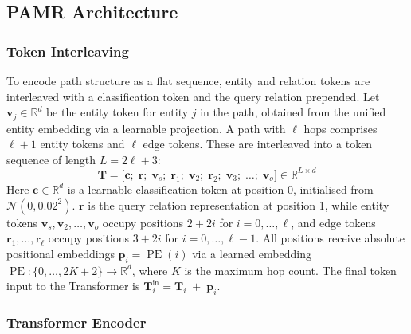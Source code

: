 \documentclass[runningheads]{llncs}
\begin{document}
\subsection{PAMR Architecture}
\label{sec:pamr-architecture}

\subsubsection{Token Interleaving}
\label{sec:token-interleaving}

To encode path structure as a flat sequence, entity and relation tokens are interleaved
with a classification token and the query relation prepended.
Let $\mathbf{v}_j \in \mathbb{R}^{d}$ be the entity token for entity $j$ in the path,
obtained from the unified entity embedding via a learnable projection.
A path with $\ell$ hops comprises $\ell+1$ entity tokens and $\ell$ edge tokens.
These are interleaved into a token sequence of length $L = 2\ell + 3$:
\begin{equation}
  \mathbf{T} = \bigl[\mathbf{c};\; \mathbf{r};\;
    \mathbf{v}_{s};\; \mathbf{r}_{1};\; \mathbf{v}_{2};\; \mathbf{r}_{2};\;
  \mathbf{v}_{3};\; \ldots;\; \mathbf{v}_{o}\bigr]
  \in \mathbb{R}^{L \times d}
  \label{eq:token-seq}
\end{equation}
Here $\mathbf{c} \in \mathbb{R}^{d}$ is a learnable classification token
at position 0, initialised from $\mathcal{N}(0, 0.02^2)$.
$\mathbf{r}$ is the query relation representation at position 1, while entity tokens
$\mathbf{v}_{s}, \mathbf{v}_{2}, \ldots, \mathbf{v}_{o}$ occupy positions $2 + 2i$
for $i = 0, \ldots, \ell$, and edge tokens $\mathbf{r}_{1}, \ldots, \mathbf{r}_{\ell}$
occupy positions $3 + 2i$ for $i = 0, \ldots, \ell - 1$.
All positions receive absolute positional embeddings
$\mathbf{p}_i = \operatorname{PE}(i)$ via a learned embedding
$\operatorname{PE}: \{0, \ldots, 2K+2\} \to \mathbb{R}^{d}$,
where $K$ is the maximum hop count.
The final token input to the Transformer is $\mathbf{T}^{\text{in}}_i = \mathbf{T}_i \;+\; \mathbf{p}_i$.
\subsubsection{Transformer Encoder}

\label{sec:transformer-encoder}
\end{document}
